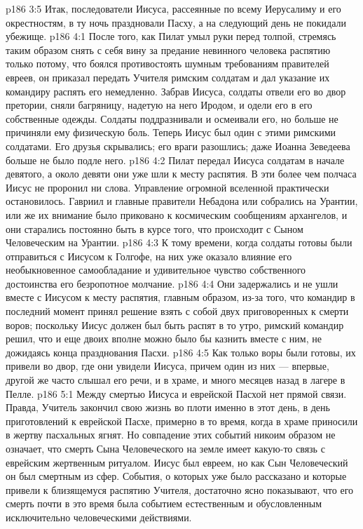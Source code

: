 \vs p186 3:5 Итак, последователи Иисуса, рассеянные по всему Иерусалиму и его окрестностям, в ту ночь праздновали Пасху, а на следующий день не покидали убежище.
\vs p186 4:1 После того, как Пилат умыл руки перед толпой, стремясь таким образом снять с себя вину за предание невинного человека распятию только потому, что боялся противостоять шумным требованиям правителей евреев, он приказал передать Учителя римским солдатам и дал указание их командиру распять его немедленно. Забрав Иисуса, солдаты отвели его во двор претории, сняли багряницу, надетую на него Иродом, и одели его в его собственные одежды. Солдаты поддразнивали и осмеивали его, но больше не причиняли ему физическую боль. Теперь Иисус был один с этими римскими солдатами. Его друзья скрывались; его враги разошлись; даже Иоанна Зеведеева больше не было подле него.
\vs p186 4:2 Пилат передал Иисуса солдатам в начале девятого, а около девяти они уже шли к месту распятия. В эти более чем полчаса Иисус не проронил ни слова. Управление огромной вселенной практически остановилось. Гавриил и главные правители Небадона или собрались на Урантии, или же их внимание было приковано к космическим сообщениям архангелов, и они старались постоянно быть в курсе того, что происходит с Сыном Человеческим на Урантии.
\vs p186 4:3 К тому времени, когда солдаты готовы были отправиться с Иисусом к Голгофе, на них уже оказало влияние его необыкновенное самообладание и удивительное чувство собственного достоинства его безропотное молчание.
\vs p186 4:4 Они задержались и не ушли вместе с Иисусом к месту распятия, главным образом, из\hyp{}за того, что командир в последний момент принял решение взять с собой двух приговоренных к смерти воров; поскольку Иисус должен был быть распят в то утро, римский командир решил, что и еще двоих вполне можно было бы казнить вместе с ним, не дожидаясь конца празднования Пасхи.
\vs p186 4:5 Как только воры были готовы, их привели во двор, где они увидели Иисуса, причем один из них --- впервые, другой же часто слышал его речи, и в храме, и много месяцев назад в лагере в Пелле.
\vs p186 5:1 Между смертью Иисуса и еврейской Пасхой нет прямой связи. Правда, Учитель закончил свою жизнь во плоти именно в этот день, в день приготовлений к еврейской Пасхе, примерно в то время, когда в храме приносили в жертву пасхальных ягнят. Но совпадение этих событий никоим образом не означает, что смерть Сына Человеческого на земле имеет какую\hyp{}то связь с еврейским жертвенным ритуалом. Иисус был евреем, но как Сын Человеческий он был смертным из сфер. События, о которых уже было рассказано и которые привели к близящемуся распятию Учителя, достаточно ясно показывают, что его смерть почти в это время была событием естественным и обусловленным исключительно человеческими действиями.
